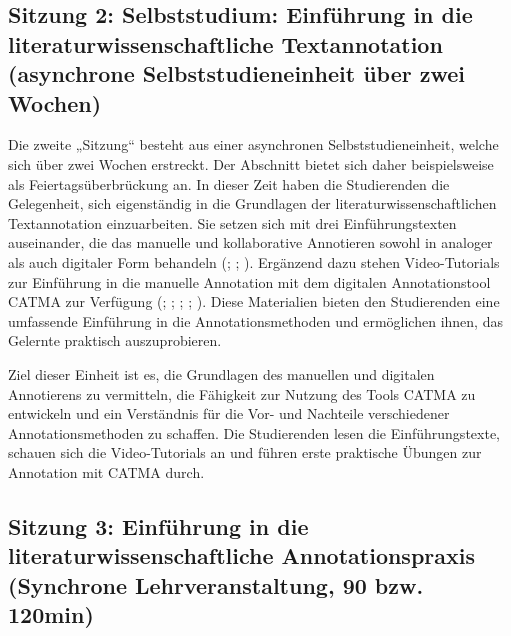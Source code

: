 \documentclass[
          a4paper,
        ]{article}
\begin{document}
\subsection{Sitzung 2: Selbststudium: Einführung in die
literaturwissenschaftliche Textannotation (asynchrone
Selbststudieneinheit über zwei
Wochen)}\label{sitzung-2-selbststudium-einfuxfchrung-in-die-literaturwissenschaftliche-textannotation-asynchrone-selbststudieneinheit-uxfcber-zwei-wochen}

Die zweite „Sitzung`` besteht aus einer asynchronen
Selbststudieneinheit, welche sich über zwei Wochen erstreckt. Der
Abschnitt bietet sich daher beispielsweise als Feiertagsüberbrückung an.
In dieser Zeit haben die Studierenden die Gelegenheit, sich eigenständig
in die Grundlagen der literaturwissenschaftlichen Textannotation
einzuarbeiten. Sie setzen sich mit drei Einführungstexten auseinander,
die das manuelle und kollaborative Annotieren sowohl in analoger als
auch digitaler Form behandeln
(;
;
). Ergänzend dazu stehen Video-Tutorials zur Einführung in die
manuelle Annotation mit dem digitalen Annotationstool CATMA zur
Verfügung (;
;
;
;
). Diese
Materialien bieten den Studierenden eine umfassende Einführung in die
Annotationsmethoden und ermöglichen ihnen, das Gelernte praktisch
auszuprobieren.

Ziel dieser Einheit ist es, die Grundlagen des manuellen und digitalen
Annotierens zu vermitteln, die Fähigkeit zur Nutzung des Tools CATMA zu
entwickeln und ein Verständnis für die Vor- und Nachteile verschiedener
Annotationsmethoden zu schaffen. Die Studierenden lesen die
Einführungstexte, schauen sich die Video-Tutorials an und führen erste
praktische Übungen zur Annotation mit CATMA durch.

\subsection{Sitzung 3: Einführung in die literaturwissenschaftliche
Annotationspraxis (Synchrone Lehrveranstaltung, 90 bzw.
120min)}\label{sitzung-3-einfuxfchrung-in-die-literaturwissenschaftliche-annotationspraxis-synchrone-lehrveranstaltung-90-bzw.-120min}
\end{document}
